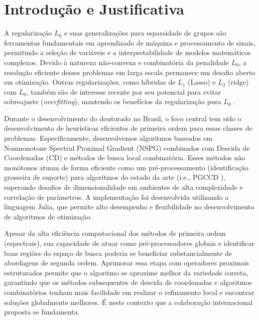 \section{Introdução e Justificativa}

A regularização $L_0$ e suas generalizações para esparsidade de grupos são ferramentas fundamentais em aprendizado de máquina e processamento de sinais, permitindo a seleção de variáveis e a interpretabilidade de modelos matemáticos complexos. Devido à natureza não-convexa e combinatória da penalidade $L_0$, a resolução eficiente desses problemas em larga escala permanece um desafio aberto em otimização. Outras regularizações, como híbridas de $L_1$ (Lasso) e $L_2$ (ridge) com $L_0$, também são de interesse recente por seu potencial para evitar sobreajuste (\textit{overfitting}), mantendo os benefícios da regularização pura $L_0$ \cite{fastselect}.

Durante o desenvolvimento do doutorado no Brasil, o foco central tem sido o desenvolvimento de heurísticas eficientes de primeira ordem para essas classes de problemas. Especificamente, desenvolvemos algoritmos baseados em Nonmonotone Spectral Proximal Gradient (NSPG) combinados com Descida de Coordenadas (CD) e métodos de busca local combinatória. Esses métodos não monótonos atuam de forma eficiente como um pré-processamento (identificação grosseira de suporte) para algoritmos do estado da arte (i.e., PGCCD \cite{fastselect}), superando desafios de dimensionalidade em ambientes de alta complexidade e correlação de parâmetros. A implementação foi desenvolvida utilizando a linguagem Julia, que permite alto desempenho e flexibilidade no desenvolvimento de algoritmos de otimização.

Apesar da alta eficiência computacional dos métodos de primeira ordem (espectrais), sua capacidade de atuar como pré-processadores globais e identificar boas regiões do espaço de busca poderia se beneficiar substancialmente de abordagens de segunda ordem. Aprimorar essa etapa com operadores proximais estruturados permite que o algoritmo se aproxime melhor da variedade correta, garantindo que os métodos subsequentes de descida de coordenadas e algoritmos combinatórios tenham mais facilidade em realizar o refinamento local e encontrar soluções globalmente melhores. É neste contexto que a colaboração internacional proposta se fundamenta.

